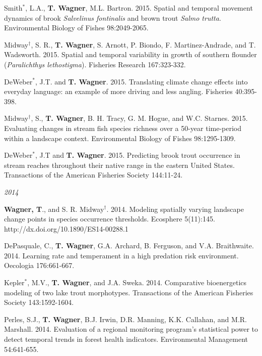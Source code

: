 \documentclass[10pt]{article}
\begin{document}
\begin{flushleft}
\begin{etaremune}[start=48]
\item Smith$^*$, L.A., {\bf T. Wagner}, M.L. Bartron. 2015. Spatial and temporal movement dynamics of brook \emph{Salvelinus fontinalis} and brown trout \emph{Salmo trutta}. Environmental Biology of Fishes 98:2049-2065.

\item Midway$^\dagger$, S. R., {\bf T. Wagner}, S. Arnott, P. Biondo, F. Martinez-Andrade, and T. Wadsworth. 2015. Spatial and temporal variability in growth of southern flounder (\emph{Paralichthys lethostigma}). Fisheries Research 167:323-332.

\item DeWeber$^*$, J.T. and {\bf T. Wagner}. 2015. Translating climate change effects into everyday language: an example of more driving and less angling. Fisheries 40:395-398.

\item Midway$^\dagger$, S., {\bf T. Wagner}, B. H. Tracy, G. M. Hogue, and W.C. Starnes. 2015. Evaluating changes in stream fish species richness over a 50-year time-period within a landscape context. Environmental Biology of Fishes 98:1295-1309.

\item DeWeber$^*$, J.T and {\bf T. Wagner}. 2015. Predicting brook trout occurrence in stream reaches throughout their native range in the eastern United States. Transactions of the American Fisheries Society 144:11-24. 

\end{etaremune}
\emph{2014}
\begin{etaremune}[start=41]
\item {\bf Wagner, T}., and S. R. Midway$^\dagger$. 2014. Modeling spatially varying landscape change points in species occurrence thresholds. Ecosphere 5(11):145. http://dx.doi.org/10.1890/ES14-00288.1 

\item DePasquale, C., {\bf T. Wagner}, G.A. Archard, B. Ferguson, and V.A. Braithwaite. 2014. Learning rate and temperament in a high predation risk environment. Oecologia 176:661-667. 

\item Kepler$^*$, M.V., {\bf T. Wagner}, and J.A. Sweka. 2014. Comparative bioenergetics modeling of two lake trout morphotypes. Transactions of the American Fisheries Society 143:1592-1604.

\item Perles, S.J., {\bf T. Wagner}, B.J. Irwin, D.R. Manning, K.K. Callahan, and M.R. Marshall. 2014. Evaluation of a regional monitoring program's statistical power to detect temporal trends in forest health indicators. Environmental Management 54:641-655.


\end{etaremune}
\end{flushleft}
\end{document}
